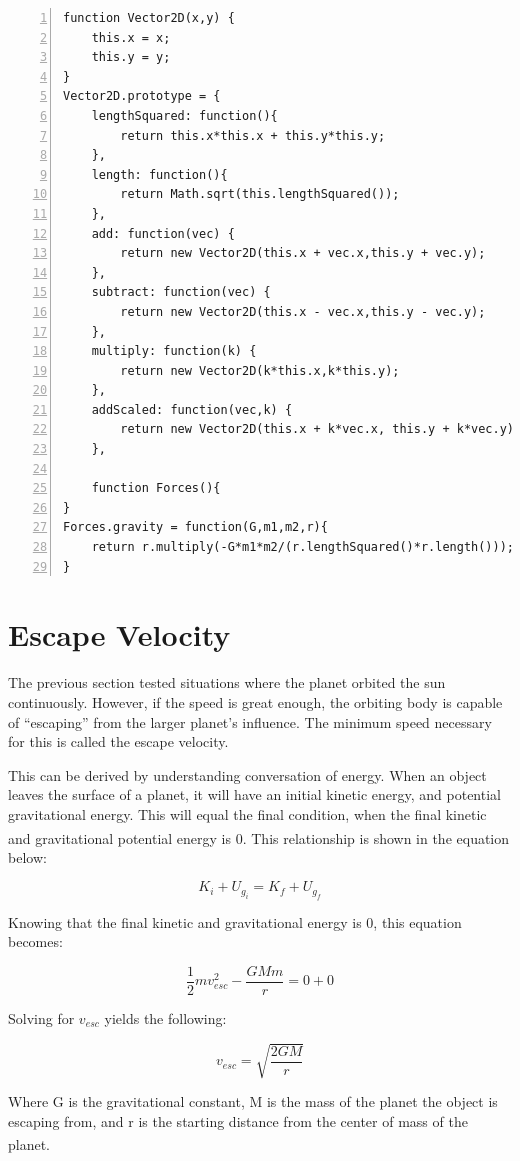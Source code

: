 \begin{lstlisting}[breaklines=true, frame=single, numbers=left, caption=Various tools functions used for orbit simulation, label=lst:basicorbittools]
function Vector2D(x,y) {
	this.x = x;
	this.y = y;		
}	
Vector2D.prototype = {		
	lengthSquared: function(){
		return this.x*this.x + this.y*this.y;
	},
	length: function(){
		return Math.sqrt(this.lengthSquared());
	},
	add: function(vec) {
		return new Vector2D(this.x + vec.x,this.y + vec.y);
	},
	subtract: function(vec) {
		return new Vector2D(this.x - vec.x,this.y - vec.y);
	},
	multiply: function(k) {
		return new Vector2D(k*this.x,k*this.y);
	},
	addScaled: function(vec,k) {
		return new Vector2D(this.x + k*vec.x, this.y + k*vec.y);
	},	

	function Forces(){
}
Forces.gravity = function(G,m1,m2,r){
	return r.multiply(-G*m1*m2/(r.lengthSquared()*r.length()));
}
\end{lstlisting}


\section{Escape Velocity}

The previous section tested situations where the planet orbited the sun continuously.  However, if the speed is great enough, the orbiting body is capable of ``escaping'' from the larger planet's influence.  The minimum speed necessary for this is called the escape velocity.  

This can be derived by understanding conversation of energy.  When an object leaves the surface of a planet, it will have an initial kinetic energy, and potential gravitational energy.  This will equal the final condition, when the final kinetic and gravitational potential energy is 0.\textsuperscript{\cite{engineering}}  This relationship is shown in the equation below:

$$K_i + U_{g_{i}} = K_f + U_{g_{f}}$$

Knowing that the final kinetic and gravitational energy is 0, this equation becomes:

$$\frac{1}{2}mv_{esc}^2 - \frac{GMm}{r} = 0 + 0  $$

Solving for $v_{esc}$ yields the following:

\begin{equation}\label{eq:escapevelocity}
v_{esc} = \sqrt{\frac{2GM}{r}}
\end{equation}

Where G is the gravitational constant, M is the mass of the planet the object is escaping from, and r is the starting distance from the center of mass of the planet.\textsuperscript{\cite{klepner}}  

